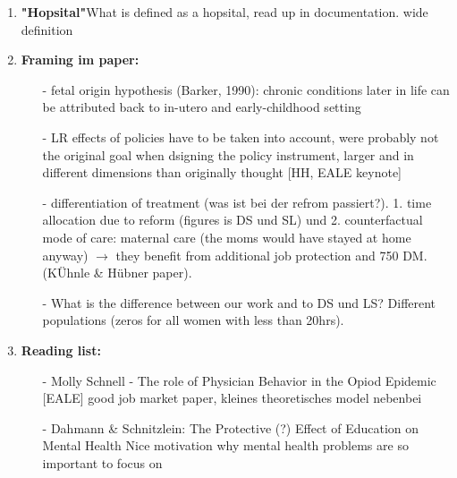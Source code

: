 \documentclass[11pt,a4paper]{article}
\begin{document}
\begin{enumerate}
\item \textbf{"Hopsital"}\newline What is defined as a hopsital, read up in documentation. wide definition


\item \textbf{Framing im paper:} \vspace{-1em}
\begin{itemize}
\item[-] fetal origin hypothesis (Barker, 1990): chronic conditions later in life can be attributed back to in-utero and early-childhood setting
\item[-] LR effects of policies have to be taken into account, were probably not the original goal when dsigning the policy instrument, larger and in different dimensions than originally thought [HH, EALE keynote]
\item[-] differentiation of treatment (was ist bei der refrom passiert?). 1. time allocation due to reform (figures is DS und SL) und 2. counterfactual mode of care: maternal care (the moms would have stayed at home anyway) $\rightarrow$ they benefit from additional job protection and 750 DM.
(KÜhnle \& Hübner paper).
\item[-] What is the difference between our work and to DS und LS? Different populations (zeros for all women with less than 20hrs).
\end{itemize}

\item \textbf{Reading list:}
\begin{itemize}
\item[-] Molly Schnell - The role of Physician Behavior in the Opiod Epidemic [EALE]\newline
good job market paper, kleines theoretisches model nebenbei
\item[-]  Dahmann \& Schnitzlein: The Protective (?) Effect of Education on Mental Health   \newline
 Nice motivation why mental health problems are so important to focus on 

\end{itemize}

\end{enumerate}
\end{document}
